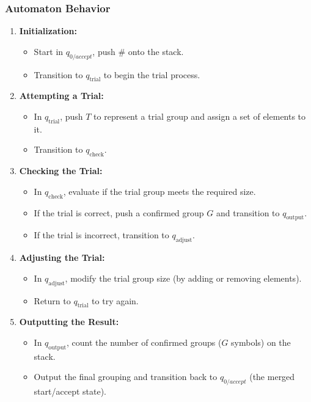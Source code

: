 \documentclass[11pt]{article}
\begin{document}
\subsubsection*{Automaton Behavior}
\begin{enumerate}
    \item \textbf{Initialization:}  
    \begin{itemize}
        \item Start in \(q_{0/accept}\), push \(\#\) onto the stack.
        \item Transition to \(q_{\text{trial}}\) to begin the trial process.
    \end{itemize}
    \item \textbf{Attempting a Trial:}  
    \begin{itemize}
        \item In \(q_{\text{trial}}\), push \(T\) to represent a trial group and assign a set of elements to it.
        \item Transition to \(q_{\text{check}}\).
    \end{itemize}
    \item \textbf{Checking the Trial:}  
    \begin{itemize}
        \item In \(q_{\text{check}}\), evaluate if the trial group meets the required size.
        \item If the trial is correct, push a confirmed group \(G\) and transition to \(q_{\text{output}}\).
        \item If the trial is incorrect, transition to \(q_{\text{adjust}}\).
    \end{itemize}
    \item \textbf{Adjusting the Trial:}  
    \begin{itemize}
        \item In \(q_{\text{adjust}}\), modify the trial group size (by adding or removing elements).
        \item Return to \(q_{\text{trial}}\) to try again.
    \end{itemize}
    \item \textbf{Outputting the Result:}  
    \begin{itemize}
        \item In \(q_{\text{output}}\), count the number of confirmed groups (\(G\) symbols) on the stack.
        \item Output the final grouping and transition back to \(q_{0/accept}\) (the merged start/accept state).
    \end{itemize}
\end{enumerate}
\end{document}
